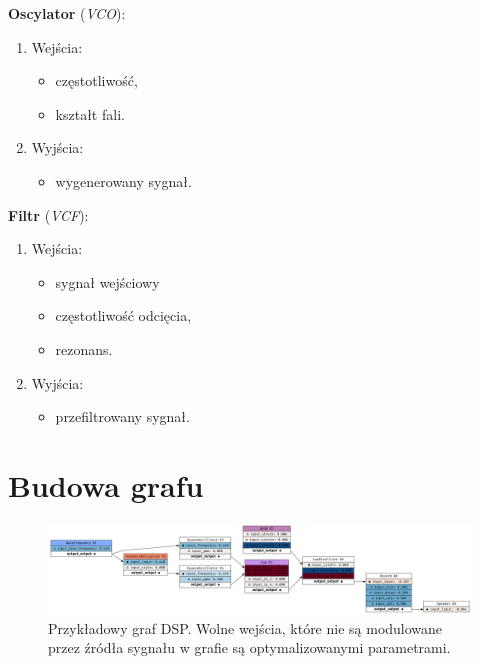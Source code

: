 \begin{multicols}{2}

\noindent
\textbf{Oscylator} (\textit{VCO}):
\begin{enumerate}
  \item Wejścia:
    \begin{itemize}
      \item częstotliwość,
      \item kształt fali.
    \end{itemize}
  \item Wyjścia:
    \begin{itemize}
      \item wygenerowany sygnał.
    \end{itemize}
\end{enumerate}

\noindent
\textbf{Filtr} (\textit{VCF}):
\begin{enumerate}
  \item Wejścia:
    \begin{itemize}
      \item sygnał wejściowy
      \item częstotliwość odcięcia,
      \item rezonans.
    \end{itemize}
  \item Wyjścia:
    \begin{itemize}
      \item przefiltrowany sygnał.
    \end{itemize}
\end{enumerate}

\end{multicols}


\section{Budowa grafu}

\begin{figure}[H]\label{fig:example_graph_definition_chapter}
    \centering
    \includegraphics[width=0.9\linewidth]{rys05/luthier_simple_analog.png}
    \caption{
      Przykładowy graf DSP\@. Wolne wejścia, które nie są modulowane przez
      źródła sygnału w grafie są optymalizowanymi parametrami.
    }
\end{figure}


